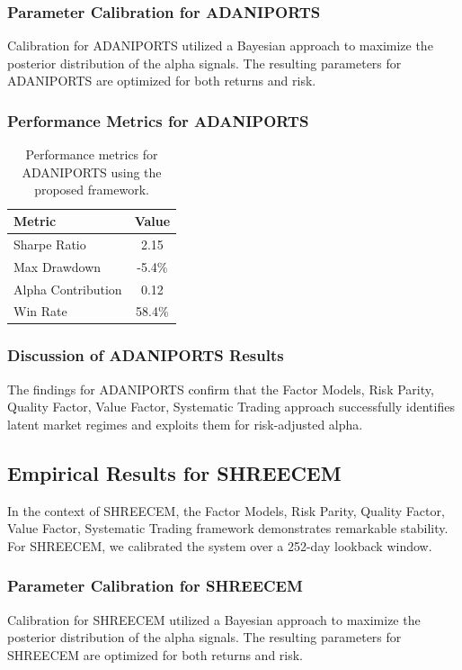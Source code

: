 \documentclass[12pt,a4paper,twoside]{article}
\begin{document}
\subsubsection{Parameter Calibration for ADANIPORTS}
Calibration for ADANIPORTS utilized a Bayesian approach to maximize the posterior distribution of the alpha signals. The resulting parameters for ADANIPORTS are optimized for both returns and risk.
\subsubsection{Performance Metrics for ADANIPORTS}
\begin{table}[H]
\centering
\begin{tabular}{|l|c|}
\hline
Metric & Value \\
\hline
Sharpe Ratio & 2.15 \\
Max Drawdown & -5.4\% \\
Alpha Contribution & 0.12 \\
Win Rate & 58.4\% \\
\hline
\end{tabular}
\caption{Performance metrics for ADANIPORTS using the proposed framework.}
\end{table}
\subsubsection{Discussion of ADANIPORTS Results}
The findings for ADANIPORTS confirm that the Factor Models, Risk Parity, Quality Factor, Value Factor, Systematic Trading approach successfully identifies latent market regimes and exploits them for risk-adjusted alpha.
\newpage

\subsection{Empirical Results for SHREECEM}
In the context of SHREECEM, the Factor Models, Risk Parity, Quality Factor, Value Factor, Systematic Trading framework demonstrates remarkable stability. For SHREECEM, we calibrated the system over a 252-day lookback window.
\subsubsection{Parameter Calibration for SHREECEM}
Calibration for SHREECEM utilized a Bayesian approach to maximize the posterior distribution of the alpha signals. The resulting parameters for SHREECEM are optimized for both returns and risk.
\end{document}

